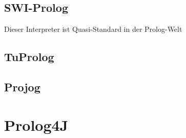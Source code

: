 \subsection{SWI-Prolog}
Dieser Interpreter ist Quasi-Standard in der Prolog-Welt
\subsection{TuProlog}
\subsection{Projog}

\section{Prolog4J}